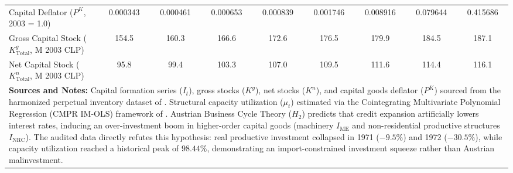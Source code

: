 \begin{table}[htbp]
{\begin{tabular}{lcccccccc}
Capital Deflator ($P^K$, 2003 = 1.0) & 0.000343 & 0.000461 & 0.000653 & 0.000839 & 0.001746 & 0.008916 & 0.079644 & 0.415686 \\
Gross Capital Stock ($K^g_{\text{Total}}$, M 2003 CLP) & 154.5 & 160.3 & 166.6 & 172.6 & 176.5 & 179.9 & 184.5 & 187.1 \\
Net Capital Stock ($K^n_{\text{Total}}$, M 2003 CLP) & 95.8 & 99.4 & 103.3 & 107.0 & 109.5 & 111.6 & 114.4 & 116.1 \\
\bottomrule
\multicolumn{9}{p{17.2cm}}{\footnotesize \textbf{Sources and Notes:} Capital formation series ($I_t$), gross stocks ($K^g$), net stocks ($K^n$), and capital goods deflator ($P^K$) sourced from the harmonized perpetual inventory dataset of \citet{Polanco2026}. Structural capacity utilization ($\mu_t$) estimated via the Cointegrating Multivariate Polynomial Regression (CMPR IM-OLS) framework of \citet{Polanco2026}. Austrian Business Cycle Theory ($H_2$) predicts that credit expansion artificially lowers interest rates, inducing an over-investment boom in higher-order capital goods (machinery $I_{\text{ME}}$ and non-residential productive structures $I_{\text{NRC}}$). The audited data directly refutes this hypothesis: real productive investment collapsed in 1971 ($-9.5\%$) and 1972 ($-30.5\%$), while capacity utilization reached a historical peak of $98.44\%$, demonstrating an import-constrained investment squeeze rather than Austrian malinvestment.}
\end{tabular}%
}
\end{table}
